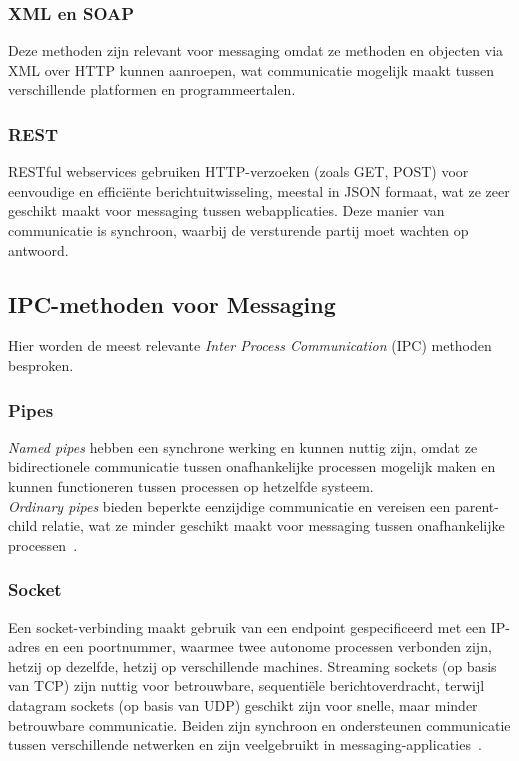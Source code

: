 \subsubsection{XML en SOAP}
Deze methoden zijn relevant voor messaging omdat ze methoden en objecten via XML over HTTP kunnen aanroepen,
wat communicatie mogelijk maakt tussen verschillende platformen en programmeertalen.

\subsubsection{REST}
RESTful webservices gebruiken HTTP-verzoeken (zoals GET, POST) voor eenvoudige en efficiënte berichtuitwisseling, 
meestal in JSON formaat, wat ze zeer geschikt maakt voor messaging tussen webapplicaties.
Deze manier van communicatie is synchroon, waarbij de versturende partij moet wachten op antwoord.

\subsection{IPC-methoden voor Messaging}
Hier worden de meest relevante \emph{Inter Process Communication} (IPC) methoden besproken.

\subsubsection{Pipes}
\emph{Named pipes} hebben een synchrone werking en kunnen nuttig zijn, omdat ze bidirectionele 
communicatie tussen onafhankelijke processen mogelijk maken en kunnen functioneren tussen processen op hetzelfde systeem. \\
\emph{Ordinary pipes} bieden beperkte eenzijdige communicatie en vereisen een parent-child relatie, 
wat ze minder geschikt maakt voor messaging tussen onafhankelijke processen~\autocite{Dinari2020}.
 
\subsubsection{Socket}
Een socket-verbinding maakt gebruik van een endpoint gespecificeerd met een IP-adres en een poortnummer, 
waarmee twee autonome processen verbonden zijn, hetzij op dezelfde, hetzij op verschillende machines.
Streaming sockets (op basis van TCP) zijn nuttig voor betrouwbare, sequentiële berichtoverdracht, 
terwijl datagram sockets (op basis van UDP) geschikt zijn voor snelle, maar minder betrouwbare communicatie.
Beiden zijn synchroon en ondersteunen communicatie tussen verschillende netwerken en zijn veelgebruikt in messaging-applicaties~\autocite{Dinari2020}.
 
